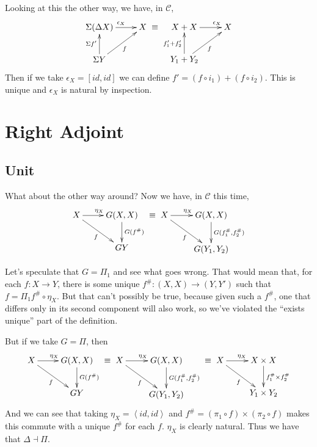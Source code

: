 \documentclass[letterpaper]{article}
\newcommand{\ang}[1]{\left\langle{#1}\right\rangle}
\begin{document}
Looking at this the other way, we have, in $\mathcal{C}$,
\[ \xymatrix{
	\Sigma (\Delta X) \ar[r]^{\epsilon_X} & X \\
    \Sigma Y \ar[u]^{\Sigma f'} \ar[ur]_{f}
} \equiv \xymatrix{
	X + X \ar[r]^(.75){\epsilon_X} & X \\
    Y_1 + Y_2 \ar[u]^{f'_1 + f'_2} \ar[ur]_{f}
} \] 
Then if we take $\epsilon_X = [id,id]$ we can define $f' = (f \circ i_1) + (f
\circ i_2)$.  This is unique and $\epsilon_X$ is natural by inspection.

\section{Right Adjoint}
\subsection{Unit}

What about the other way around?  Now we have, in $\mathcal{C}$ this time,
\[ \xymatrix{
	X \ar[r]^{\eta_X} \ar[rd]_{f} & G (X, X) \ar[d]^{G (f^\#)} \\
                                  & G Y
} \equiv \xymatrix {
	X \ar[r]^{\eta_X} \ar[rd]_{f} & G (X, X) \ar[d]^{G (f^\#_1, f^\#_2)} \\
                                  & G (Y_1, Y_2)
}  \]

Let's speculate that $G = \Pi_1$ and see what goes wrong.  That would mean
that, for each $f : X \to Y$, there is some unique $f^\# : (X,X) \to (Y,Y')$
such that $f = \Pi_1 f^\# \circ \eta_X$.  But that can't possibly be true, because
given such a $f^\#$, one that differs only in its second component will also
work, so we've violated the ``exists unique'' part of the definition.

But if we take $G = \Pi$, then
\[ \xymatrix{
	X \ar[r]^{\eta_X} \ar[rd]_{f} & G (X, X) \ar[d]^{G (f^\#)} \\
                                  & G Y
} \equiv \xymatrix {
	X \ar[r]^{\eta_X} \ar[rd]_{f} & G (X, X) \ar[d]^{G (f^\#_1, f^\#_2)} \\
                                  & G (Y_1, Y_2)
} \equiv \xymatrix {
	X \ar[r]^{\eta_X} \ar[rd]_{f} & X \times X \ar[d]^{f^\#_1 \times f^\#_2} \\
                                  & Y_1 \times Y_2
}  \]
And we can see that taking $\eta_X = \ang{id,id}$ and $f^\# = (\pi_1 \circ f)
\times (\pi_2 \circ f)$ makes this commute with a unique $f^\#$ for each
$f$.  $\eta_X$ is clearly natural.  Thus we have that $\Delta \dashv \Pi$.
\end{document}
